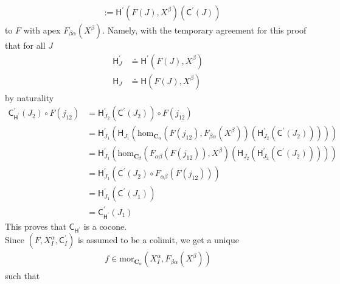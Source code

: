 \begin{prf}
\begin{align*}
  &:=
  \mathsf{H}^{\prime}(F(J),X^{\beta})
  \left(
    \mathsf{C}^{\prime}(J)
  \right)
\end{align*}
to $F$ with apex $F_{\beta\alpha}(X^{\beta})$.
Namely, with the temporary agreement for this proof that for all $J$
\begin{align*}
  \mathsf{H}_{J}^{\prime}
  &\doteq
  \mathsf{H}^{\prime}(F(J),X^{\beta})
  \\
  \mathsf{H}_{J}
  &\doteq
  \mathsf{H}(F(J),X^{\beta})
\end{align*}
by naturality
\begin{align*}
  \mathsf{C}_{\mathsf{H}^{\prime}}^{\prime}(J_{2})
  \circ
  F(j_{12})
  &=
  \mathsf{H}_{J_{2}}^{\prime}
  \left(
    \mathsf{C}^{\prime}(J_{2})
  \right)
  \circ
  F(j_{12})
  \\
  &=
  \mathsf{H}_{J_{1}}^{\prime}
  \left(
    \mathsf{H}_{J_{1}}
    \left(
      \mathrm{hom}_{\mathbf{C}_{\alpha}}
      \left(
        F(j_{12}),
        F_{\beta\alpha}(X^{\beta})
      \right)
      \left(
        \mathsf{H}_{J_{2}}^{\prime}
        \left(
        \mathsf{C}^{\prime}(J_{2})
        \right)
      \right)
    \right)
  \right)
  \\
  &=
  \mathsf{H}_{J_{1}}^{\prime}
  \left(
    \mathrm{hom}_{\mathbf{C}_{\beta}}
    \left(
      F_{\alpha\beta}
      \left(
        F(j_{12})
      \right),
      X^{\beta}
    \right)
    \left(
      \mathsf{H}_{J_{2}}
      \left(
        \mathsf{H}_{J_{2}}^{\prime}
        \left(
        \mathsf{C}^{\prime}(J_{2})
        \right)
      \right)
    \right)
  \right)
  \tag{NT}
  \\
  &=
  \mathsf{H}_{J_{1}}^{\prime}
  \left(
    \mathsf{C}^{\prime}(J_{2})
    \circ
    F_{\alpha\beta}
    \left(
      F(j_{12})
    \right)
  \right)
  \\
  &=
  \mathsf{H}_{J_{1}}^{\prime}
  \left(
    \mathsf{C}^{\prime}(J_{1})
  \right)
  \\
  &=
  \mathsf{C}_{\mathsf{H}^{\prime}}^{\prime}(J_{1})
\end{align*}
This proves that $\mathsf{C}_{\mathsf{H}^{\prime}}$ is a cocone.
\\
Since $(F,X_{I}^{\alpha},\mathsf{C}_{I}^{\prime})$ is assumed to be a colimit, we get a unique
\begin{align*}
  f
  \in
  \mathrm{mor}_{\mathbf{C}_{\alpha}}
  \left(
    X_{I}^{\alpha},
    F_{\beta\alpha}(X^{\beta})
  \right)
\end{align*}
such that
\[
\begin{tikzcd}[sep=huge]

\end{tikzcd}\]
\end{prf}
